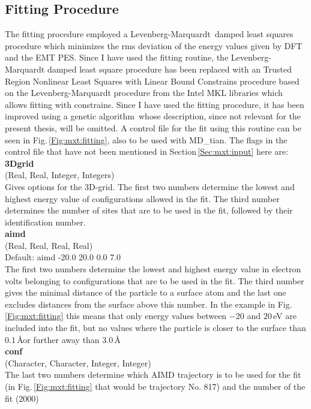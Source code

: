 \documentclass[twoside, 11pt, titlepage, captions=nooneline, a4paper, headsepline]{scrbook}%
\begin{document}
\subsection{Fitting Procedure}
The fitting procedure employed a Levenberg-Marquardt\,\cite{Levenberg1944,Marquardt1963} damped least squares procedure which minimizes the rms deviation of the energy values given by DFT and the EMT PES. Since I have used the fitting routine, the Levenberg-Marquardt damped least square procedure has been replaced with an Trusted Region Nonlinear Least Squares with Linear Bound Constrains procedure based on the Levenberg-Marquardt procedure from the Intel MKL libraries which allows fitting with constrains. Since I have used the fitting procedure, it has been improved using a genetic algorithm\,\cite{marvinmaster,marvinpc} whose description, since not relevant for the present thesis, will be omitted. A control file for the fit using this routine can be seen in Fig.\,\ref{Fig:mxt:fitting}, also to be used with MD\_tian. The flags in the control file that have not been mentioned in Section\,\ref{Sec:mxt:input} here are:\\

\noindent\textbf{3Dgrid}\\
(Real, Real, Integer, Integers)\\
Gives options for the 3D-grid. The first two numbers determine the lowest and highest energy value of configurations allowed in the fit. The third number determines the number of sites that are to be used in the fit, followed by their identification number.\\

\noindent\textbf{aimd}\\
(Real, Real, Real, Real)\\ 
Default: aimd -20.0 20.0 0.0 7.0\\
The first two numbers determine the lowest and highest energy value in electron volts belonging to configurations that are to be used in the fit. The third number gives the minimal distance of the particle to a surface atom and the last one excludes distances from the surface above this number. In the example in Fig.\,\ref{Fig:mxt:fitting} this means that only energy values between $-20$ and $20$\,eV are included into the fit, but no values where the particle is closer to the surface than $0.1$\,\AA or further away than $3.0$\,\AA\\

\noindent\textbf{conf}\\
(Character, Character, Integer, Integer)\\ 
The last two numbers determine which AIMD trajectory is to be used for the fit (in Fig.\,\ref{Fig:mxt:fitting} that would be trajectory No. 817) and the number of the fit (2000)\\
\end{document}
